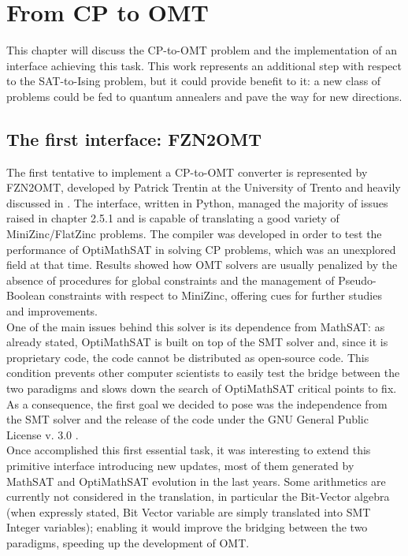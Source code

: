 \chapter{From CP to OMT}
\label{cha:OMTcore}

This chapter will discuss the CP-to-OMT problem and the implementation of an interface achieving this task. This work represents an additional step with respect to the SAT-to-Ising problem, but it could provide benefit to it: a new class of problems could be fed to quantum annealers and pave the way for new directions. 

\section{The first interface: FZN2OMT}

The first tentative to implement a CP-to-OMT converter is represented by FZN2OMT, developed by Patrick Trentin at the University of Trento and heavily discussed in \cite{cp2omt}. The interface, written in Python, managed the majority of issues raised in chapter 2.5.1 and is capable of translating a good variety of MiniZinc/FlatZinc problems. The compiler was developed in order to test the performance of OptiMathSAT in solving CP problems, which was an unexplored field at that time. Results showed how OMT solvers are usually penalized by the absence of procedures for global constraints and the management of Pseudo-Boolean constraints with respect to MiniZinc, offering cues for further studies and improvements. \\
One of the main issues behind this solver is its dependence from MathSAT: as already stated, OptiMathSAT is built on top of the SMT solver and, since it is proprietary code, the code cannot be distributed as open-source code. This condition prevents other computer scientists to easily test the bridge between the two paradigms and slows down the search of OptiMathSAT critical points to fix. As a consequence, the first goal we decided to pose was the independence from the SMT solver and the release of the code under the GNU General Public License v. 3.0 \cite{GPL}. \\
Once accomplished this first essential task, it was interesting to extend this primitive interface introducing new updates, most of them generated by MathSAT and OptiMathSAT evolution in the last years. Some arithmetics are currently not considered in the translation, in particular the Bit-Vector algebra (when expressly stated, Bit Vector variable are simply translated into SMT Integer variables); enabling it would improve the bridging between the two paradigms, speeding up the development of OMT.


